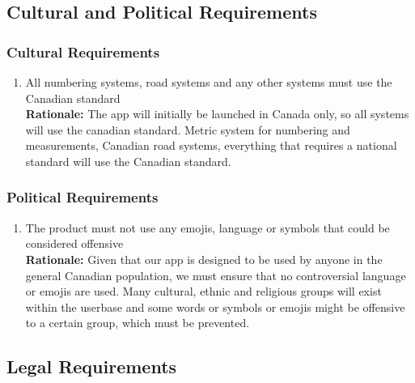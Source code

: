 \documentclass[]{article}
\begin{document}

\subsection{Cultural and Political Requirements}
\label{sub:cultural_and_political_requirements}

\subsubsection{Cultural Requirements}
\label{ssub:cultural_requirements}
\begin{enumerate}[{CP-C}1. ]
	\item All numbering systems, road systems and any other systems must use the Canadian standard \\
	{\bf Rationale:} The app will initially be launched in Canada only, so all systems will use the canadian standard. Metric system for numbering and measurements, Canadian road systems, everything that requires a national standard will use the Canadian standard.
\end{enumerate}

\subsubsection{Political Requirements}
\label{ssub:political_requirements}
\begin{enumerate}[{CP-P}1. ]
	\item The product must not use any emojis, language or symbols that could be considered offensive \\
	{\bf Rationale:} Given that our app is designed to be used by anyone in the general Canadian population, we must ensure that no controversial language or emojis are used. Many cultural, ethnic and religious groups will exist within the userbase and some words or symbols or emojis might be offensive to a certain group, which must be prevented.
\end{enumerate}


\subsection{Legal Requirements}
\label{sub:legal_requirements}
\end{document}
